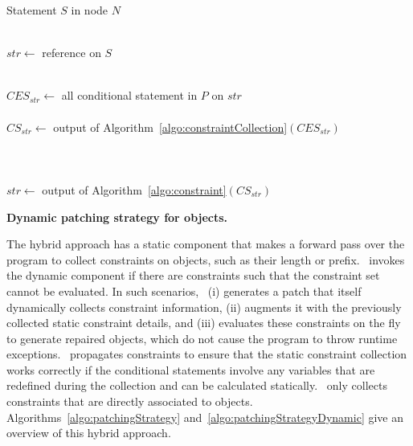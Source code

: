 \begin{algorithm}[t]
\scriptsize
\DontPrintSemicolon
{}
\Begin
{
  {
  Statement $S$ in node $N$\\
   {\\
  	\mytab $str \longleftarrow$  reference on $S$
  	
  	 {\\
          \mytab $CES_{str} \longleftarrow$ all conditional statement in $P$ on
$str$\\
 
 \mytab  {}\\
  	  \mytab $CS_{str} \longleftarrow$ output of
Algorithm~\ref{algo:constraintCollection}$(CES_{str})$\\

  		\mytab {} {\\
  		
  		\mytab \mytab {} {\\

\mytab\mytab {}\\
                        \mytab \mytab \mytab $str \longleftarrow$ output of
Algorithm~\ref{algo:constraint}$(CS_{str})$
  		} \mytab \mytab {}
  		}
		\vspace{-4em} 
    }
  }
 }
}

\caption{\bf Dynamic patching strategy for  objects.}
\label{algo:patchingStrategyDynamic}
\end{algorithm}

The hybrid approach has a static component that makes a forward pass over the
program to collect constraints on  objects, such as their length or
prefix. \tool\ invokes the dynamic component if there are constraints such that
the constraint set cannot be evaluated. In such scenarios, \tool\ (i) generates
a patch that itself dynamically collects constraint information, (ii) augments
it with the previously collected static constraint details, and (iii) evaluates
these constraints on the fly to generate repaired  objects, which
do not cause the program to throw runtime exceptions. \tool\ propagates
constraints to ensure that the static constraint collection works correctly if
the conditional statements involve any variables that are redefined during the
collection and can be calculated statically. \tool\ only collects constraints
that are directly associated to  objects.
Algorithms~\ref{algo:patchingStrategy} and~\ref{algo:patchingStrategyDynamic}
give an overview of this hybrid approach.

